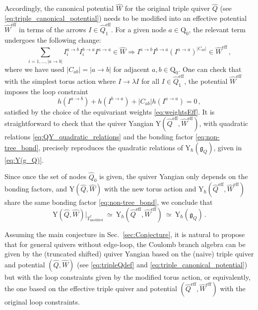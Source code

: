 \documentclass[12pt,a4paper]{article}
\renewcommand{\(}{\left(}
\renewcommand{\)}{\right)}
\renewcommand{\(}{\left(}
\renewcommand{\)}{\right)}
\begin{document}
Accordingly, the canonical potential $\widehat{W}$ for the original triple quiver $\widehat{Q}$ (see \eqref{eq:triple_canonical_potential}) needs to be modified into an effective potential $\widehat{W}^{\text{eff}}$ in terms of the arrows $I\in \widehat{Q}^{\text{eff}}_1$. For a given node $a\in\mathrm{Q}_0$, the relevant term undergoes the following change:
\begin{equation}
\sum_{i=1,\dots, |a\to b|}I_i^{a\to b}I_i^{b\to a}I^{a\to a}\in \widehat{W}\Longrightarrow I^{a\to b}I^{b\to a} (I^{a\to a})^{|C_{ab}|} \in \widehat{W}^{\text{eff}}\,,
\end{equation}
where we have used $|C_{ab}|=|a\to b|$ for adjacent $a,b\in \mathrm{Q}_0$. 
One can check that with the simplest torus action where $I\rightarrow \lambda I$ for all $I\in \widehat{Q}^{\text{eff}}_1$, the potential $\widehat{W}^{\text{eff}}$ imposes the loop constraint
\begin{equation}
h(I^{a\to b})+h(I^{b\to a} )+|C_{ab}|h(I^{a\to a})=0\,,  
\end{equation}
satisfied by the choice of the equivariant weights \eqref{eq:weightsEff}. 
It is straightforward to check that the quiver Yangian Y$(\widehat{Q}^{\textrm{eff}},\widehat{W}^{\textrm{eff}})$, with  quadratic relations \eqref{eq:QY_quadratic_relations} and the bonding factor \eqref{eq:non-tree_bond}, precisely reproduces the quadratic relations of Y$_{\hbar}(\mathfrak{g}_Q)$, given in \eqref{eq:Y(g_Q)}.

\medskip

Since once the set of nodes $\widehat{Q}_0$ is given, the quiver Yangian only depends on the bonding factors, and Y$(\widehat{Q},\widehat{W})$ with the new torus action and Y$_{\hbar}(\widehat{Q}^{\textrm{eff}},\widehat{W}^{\textrm{eff}})$ share the same bonding factor \eqref{eq:non-tree_bond},
we conclude that 
\begin{equation}
\textrm{Y}(\widehat{Q},\widehat{W}) |_{T^{*}_{\textrm{modified}}}
\ \simeq \  
\textrm{Y}_{\hbar}(\widehat{Q}^{\textrm{eff}},\widehat{W}^{\textrm{eff}}) 
\ \simeq \ 
\textrm{Y}_{\hbar}(\mathfrak{g}_Q) 
\,.    
\end{equation}


Assuming the main conjecture in Sec.~\ref{sec:Conjecture}, it is natural to propose that for general quivers without edge-loop, the Coulomb branch algebra can be given by the (truncated shifted) quiver Yangian based on the (naive) triple quiver and potential $(\widehat{Q},\widehat{W})$ (see \eqref{eq:tripleQdef} and \eqref{eq:triple_canonical_potential}) but with the loop constraints given by the modified torus action, or equivalently, the one based on the effective triple quiver and potential $(\widehat{Q}^{\text{eff}},\widehat{W}^{\text{eff}})$ with the original loop constraints.
\end{document}
